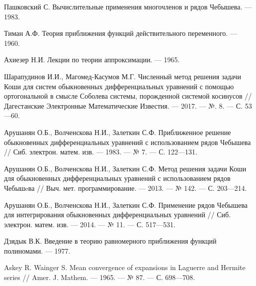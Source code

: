 \begin{thebibliography}{99}
Пашковский С. Вычислительные применения многочленов и рядов Чебышева. --- 1983.






Тиман А.Ф. Теория приближения функций действительного переменного. --- 1960.






Ахиезер Н.И. Лекции по теории аппроксимации. --- 1965.






Шарапудинов И.И., Магомед-Касумов М.Г. Численный метод решения задачи Коши для систем обыкновенных дифференциальных уравнений с помощью ортогональной в смысле Соболева системы, порожденной системой косинусов // Дагестанские Электронные Математические Известия. --- 2017. --- №. 8. --- С. 53---60.






Арушанян О.Б., Волченскова Н.И., Залеткин С.Ф. Приближенное решение обыкновенных дифференциальных уравнений с использованием рядов Чебышева // Сиб. электрон. матем. изв. --- 1983. --- № 7. --- С. 122---131.






Арушанян О.Б., Волченскова Н.И., Залеткин С.Ф. Метод решения задачи Коши для обыкновенных дифференциальных уравнений с использованием рядов Чебышeва // Выч. мет. программирование. --- 2013. --- № 142. --- С. 203---214.






Арушанян О.Б., Волченскова Н.И., Залеткин С.Ф. Применение рядов Чебышева для интегрирования обыкновенных дифференциальных уравнений // Сиб. электрон. матем. изв. --- 2014. --- № 11. --- С. 517---531.






Дзядык В.К. Введение в теорию равномерного приближения функций полиномами. --- 1977.






Askey R. Wainger S. Mean convergence of expansions in Laguerre and Hermite series // Amer. J. Mathem. --- 1965. --- № 87. --- С. 698---708.


\end{thebibliography}
